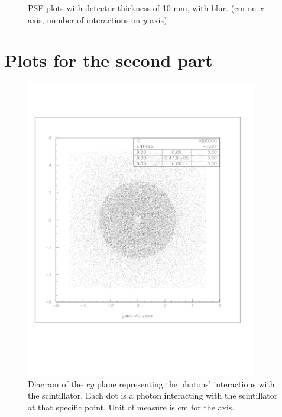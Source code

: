 \documentclass[a4paper]{article}
\begin{document}
\begin{figure}[H]
  \caption{PSF plots with detector thickness of 10 mm, with blur. (cm on $x$ axis, number of interactions on $y$ axis)}
  \label{fig:100_xse}
\end{figure}

\section{Plots for the second part}
\label{sec:appendix_2}

\begin{figure}[H]
  \centering
  \includegraphics[width=0.9\textwidth]{ex_images/2_2d_10.jpg}
  \caption{Diagram of the $xy$ plane representing the photons' interactions with the scintillator. Each dot is a photon interacting with the scintillator at that specific point. Unit of measure is cm for the axis. }
  \label{fig:2_2d}
\end{figure}
\end{document}
